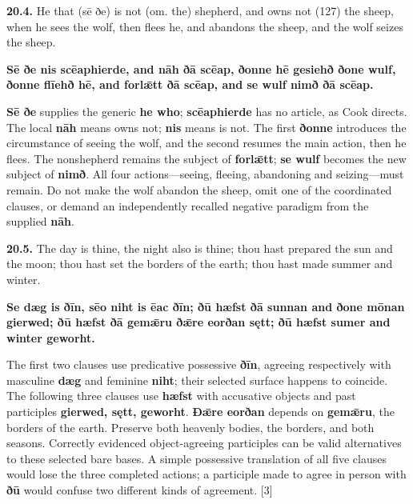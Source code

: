 \par\begin{minipage}{\linewidth}\raggedright
\textbf{20.4.} He that (sē ðe) is not (om. the) shepherd, and owns not (127) the sheep, when he sees the wolf, then flees he, and abandons the sheep, and the wolf seizes the sheep.

\textbf{Sē ðe nis scēaphierde, and nāh ðā scēap, ðonne hē gesiehð ðone wulf, ðonne flīehð hē, and forlǣtt ðā scēap, and se wulf nimð ðā scēap.}

\textbf{Sē ðe} supplies the generic \textbf{he who}; \textbf{scēaphierde} has no article, as Cook directs. The local \textbf{nāh} means owns not; \textbf{nis} means is not. The first \textbf{ðonne} introduces the circumstance of seeing the wolf, and the second resumes the main action, then he flees. The nonshepherd remains the subject of \textbf{forlǣtt}; \textbf{se wulf} becomes the new subject of \textbf{nimð}. All four actions—seeing, fleeing, abandoning and seizing—must remain. Do not make the wolf abandon the sheep, omit one of the coordinated clauses, or demand an independently recalled negative paradigm from the supplied \textbf{nāh}.

\end{minipage}\par\addvspace{4pt}

\par\begin{minipage}{\linewidth}\raggedright
\textbf{20.5.} The day is thine, the night also is thine; thou hast prepared the sun and the moon; thou hast set the borders of the earth; thou hast made summer and winter.

\textbf{Se dæg is ðīn, sēo niht is ēac ðīn; ðū hæfst ðā sunnan and ðone mōnan gierwed; ðū hæfst ðā gemǣru ðǣre eorðan sętt; ðū hæfst sumer and winter geworht.}

The first two clauses use predicative possessive \textbf{ðīn}, agreeing respectively with masculine \textbf{dæg} and feminine \textbf{niht}; their selected surface happens to coincide. The following three clauses use \textbf{hæfst} with accusative objects and past participles \textbf{gierwed, sętt, geworht}. \textbf{Ðǣre eorðan} depends on \textbf{gemǣru}, the borders of the earth. Preserve both heavenly bodies, the borders, and both seasons. Correctly evidenced object-agreeing participles can be valid alternatives to these selected bare bases. A simple possessive translation of all five clauses would lose the three completed actions; a participle made to agree in person with \textbf{ðū} would confuse two different kinds of agreement. [3]

\end{minipage}\par\addvspace{4pt}

